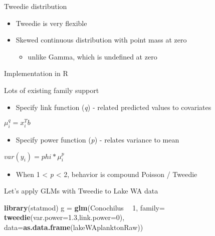 \documentclass[ignorenonframetext,]{beamer}
\newenvironment{Shaded}{\begin{snugshade}}{\end{snugshade}}
\newcommand{\DataTypeTok}[1]{\textcolor[rgb]{0.13,0.29,0.53}{#1}}
\newcommand{\DecValTok}[1]{\textcolor[rgb]{0.00,0.00,0.81}{#1}}
\newcommand{\FloatTok}[1]{\textcolor[rgb]{0.00,0.00,0.81}{#1}}
\newcommand{\KeywordTok}[1]{\textcolor[rgb]{0.13,0.29,0.53}{\textbf{#1}}}
\newcommand{\NormalTok}[1]{#1}
\newcommand{\OperatorTok}[1]{\textcolor[rgb]{0.81,0.36,0.00}{\textbf{#1}}}
\newcommand{\StringTok}[1]{\textcolor[rgb]{0.31,0.60,0.02}{#1}}
\providecommand{\tightlist}{%
  \setlength{\itemsep}{0pt}\setlength{\parskip}{0pt}}
\begin{document}
\begin{frame}{Tweedie distribution}
\protect\hypertarget{tweedie-distribution}{}

\begin{itemize}
\item
  Tweedie is very flexible
\item
  Skewed continuous distribution with point mass at zero

  \begin{itemize}
  \tightlist
  \item
    unlike Gamma, which is undefined at zero
  \end{itemize}
\end{itemize}

\end{frame}

\begin{frame}{Implementation in R}
\protect\hypertarget{implementation-in-r}{}

Lots of existing family support

\begin{itemize}
\tightlist
\item
  Specify link function (\emph{q}) - related predicted values to
  covariates
\end{itemize}

\(μ_i^q = x_i^Tb\)

\begin{itemize}
\tightlist
\item
  Specify power function (\emph{p}) - relates variance to mean
\end{itemize}

\(var(y_i) = phi * μ_i^p\)

\begin{itemize}
\tightlist
\item
  When 1 \textless{} \emph{p} \textless{} 2, behavior is compound
  Poisson / Tweedie
\end{itemize}

\end{frame}

\begin{frame}[fragile]{Let's apply GLMs with Tweedie to Lake WA data}
\protect\hypertarget{lets-apply-glms-with-tweedie-to-lake-wa-data}{}

\begin{Shaded}
\begin{Highlighting}[]
\KeywordTok{library}\NormalTok{(statmod)}
\NormalTok{g =}\StringTok{ }\KeywordTok{glm}\NormalTok{(Conochilus }\OperatorTok{~}\StringTok{ }\DecValTok{1}\NormalTok{, }\DataTypeTok{family=}
    \KeywordTok{tweedie}\NormalTok{(}\DataTypeTok{var.power=}\FloatTok{1.3}\NormalTok{,}\DataTypeTok{link.power=}\DecValTok{0}\NormalTok{), }
  \DataTypeTok{data=}\KeywordTok{as.data.frame}\NormalTok{(lakeWAplanktonRaw))}
\end{Highlighting}
\end{Shaded}

\end{frame}
\end{document}
